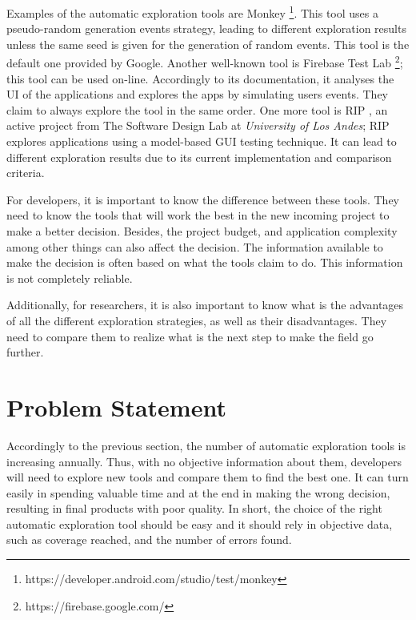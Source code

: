 Examples of the automatic exploration tools are Monkey \footnote{https://developer.android.com/studio/test/monkey}. This tool uses a pseudo-random generation events strategy, leading to different exploration results unless the same seed is given for the generation of random events. This tool is the default one provided by Google. Another well-known tool is Firebase Test Lab \footnote{https://firebase.google.com/}; this tool can be used on-line. Accordingly to its documentation, it analyses the UI of the applications and explores the apps by simulating users events. They claim to always explore the tool in the same order. One more tool is RIP \cite{Liñán}, an active project from  The Software Design Lab at \emph{University of Los Andes}; RIP explores applications using a model-based GUI testing technique. It can lead to different exploration results due to its current implementation and comparison criteria. 

For developers, it is important to know the difference between these tools. They need to know the tools that will work the best in the new incoming project to make a better decision. Besides, the project budget, and application complexity among other things can also affect the decision. The information available to make the decision is often based on what the tools claim to do. This information is not completely reliable.

Additionally, for researchers, it is also important to know what is the advantages of all the different exploration strategies, as well as their disadvantages. They need to compare them to realize what is the next step to make the field go further.


\section{Problem Statement}

Accordingly to the previous section, the number of automatic exploration tools is increasing annually. Thus, with no objective information about them, developers will need to explore new tools and compare them to find the best one. It can turn easily in spending valuable time and at the end in making the wrong decision, resulting in final products with poor quality. In short, the choice of the right automatic exploration tool should be easy and it should rely in objective data, such as coverage reached, and the number of errors found.


